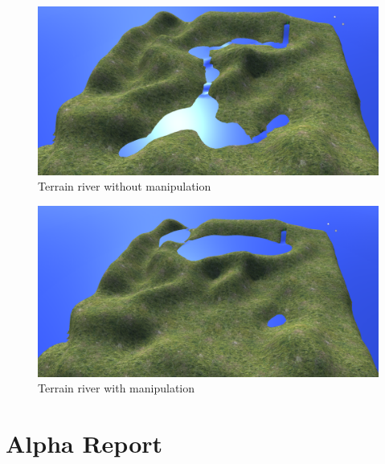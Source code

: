 \documentclass[12pt, letterpaper]{scrartcl}
\begin{document}
	\begin{figure}[H]
		\centering
		\includegraphics[width=\textwidth]{images//interim/river1}
		\caption{Terrain river without manipulation}
		\label{fig:river1}
	\end{figure}
	
	\begin{figure}[H]
		\centering
		\includegraphics[width=\textwidth]{images//interim/river2}
		\caption{Terrain river with manipulation}
		\label{fig:river2}
	\end{figure}
	
	\newpage
	\section{Alpha Report}
\end{document}
